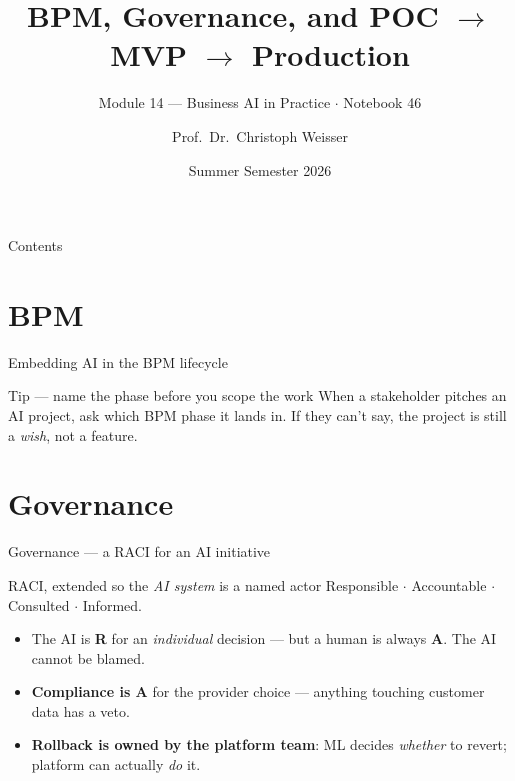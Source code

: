 \documentclass[aspectratio=169,11pt]{beamer}
\title{BPM, Governance, and POC $\to$ MVP $\to$ Production}
\subtitle{Module 14 --- Business AI in Practice $\cdot$ Notebook 46}
\author{Prof.\ Dr.\ Christoph Weisser}
\institute{HSBI}
\date{Summer Semester 2026}
\begin{document}
\begin{frame}\titlepage\end{frame}

\begin{frame}{Contents}
  \tableofcontents[hideallsubsections]
\end{frame}

\section{BPM}
\begin{frame}{Embedding AI in the BPM lifecycle}
  \begin{center}
  \end{center}
  \begin{exampleblock}{Tip --- name the phase before you scope the work}
    When a stakeholder pitches an AI project, ask which BPM phase it lands in. If they can't say, the project is still a \emph{wish}, not a feature.
  \end{exampleblock}
\end{frame}

\section{Governance}
\begin{frame}{Governance --- a RACI for an AI initiative}
  \begin{block}{RACI, extended so the \emph{AI system} is a named actor}
    Responsible $\cdot$ Accountable $\cdot$ Consulted $\cdot$ Informed.
  \end{block}
  \begin{itemize}
    \item The AI is \textbf{R} for an \emph{individual} decision --- but a human is always \textbf{A}. The AI cannot be blamed.
    \item \textbf{Compliance is A} for the provider choice --- anything touching customer data has a veto.
    \item \textbf{Rollback is owned by the platform team}: ML decides \emph{whether} to revert; platform can actually \emph{do} it.
  \end{itemize}
\end{frame}
\end{document}
